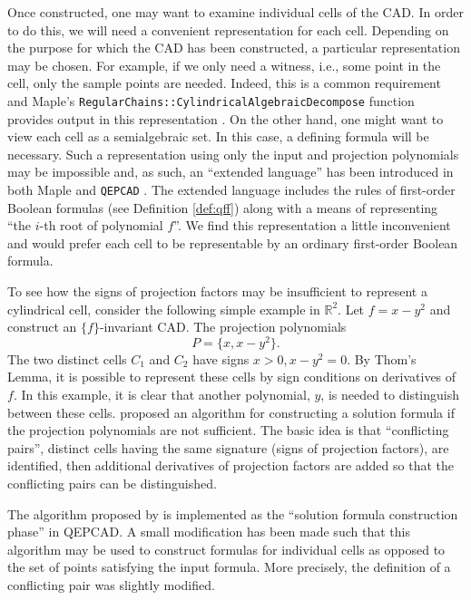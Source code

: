 \documentclass[
]{book}
\theoremstyle{definition}
\theoremstyle{definition}
\theoremstyle{definition}
\theoremstyle{definition}
\theoremstyle{remark}
\begin{document}
Once constructed, one may want to examine individual cells of the CAD.
In order to do this, we will need a convenient representation for each cell.
Depending on the purpose for which the CAD has been constructed, a particular representation may be chosen. For example, if we only need a witness, i.e., some point in the cell, only the sample points are needed. Indeed, this is a common requirement and Maple's \texttt{RegularChains::CylindricalAlgebraicDecompose} function provides output in this representation \citep{chen2014}.
On the other hand, one might want to view each cell as a semialgebraic set. In this case, a defining formula will be necessary.
Such a representation using only the input and projection polynomials may be impossible and, as such, an ``extended language'' has been introduced in both Maple and \texttt{QEPCAD} \citep[\citet{brownQepcad}]{chen2014}. The extended language includes the rules of first-order Boolean formulas (see Definition \ref{def:qff}) along with a means of representing ``the \(i\)-th root of polynomial \(f\)''. We find this representation a little inconvenient and would prefer each cell to be representable by an ordinary first-order Boolean formula.

To see how the signs of projection factors may be insufficient to represent a cylindrical cell, consider the following simple example in \(\mathbb{R}^2\).
Let \(f = x - y^2\) and construct an \(\{f\}\)-invariant CAD. The projection polynomials
\[
P = \{ x, x - y^2 \}.
\]
The two distinct cells \(C_1\) and \(C_2\) have signs \(x > 0, x - y^2 = 0\). By Thom's Lemma, it is possible to represent these cells by sign conditions on derivatives of \(f\).
In this example, it is clear that another polynomial, \(y\), is needed to distinguish between these cells. \citet{brown99} proposed an algorithm for constructing a solution formula if the projection polynomials are not sufficient. The basic idea is that ``conflicting pairs'', distinct cells having the same signature (signs of projection factors), are identified, then additional derivatives of projection factors are added so that the conflicting pairs can be distinguished.

The algorithm proposed by \citet{brown99} is implemented as the ``solution formula construction phase'' in QEPCAD. A small modification has been made such that this algorithm may be used to construct formulas for individual cells as opposed to the set of points satisfying the input formula. More precisely, the definition of a conflicting pair was slightly modified.
\end{document}
